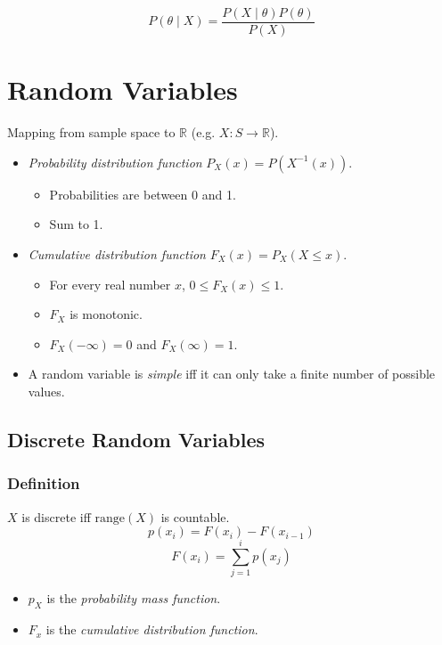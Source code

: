 \documentclass[twocolumn,english]{article}
\begin{document}
\[
P\left(\theta\mid X\right)=\frac{P\left(X\mid\theta\right)P\left(\theta\right)}{P\left(X\right)}
\]

\section{Random Variables}

Mapping from sample space to $\mathbb{R}$ (e.g. $X:S\rightarrow\mathbb{R}$).
\begin{itemize}
\item \emph{Probability distribution function} $P_{X}\left(x\right)=P\left(X^{-1}\left(x\right)\right)$.
\begin{itemize}
\item Probabilities are between 0 and 1.
\item Sum to 1.
\end{itemize}
\item \emph{Cumulative distribution function} $F_{X}\left(x\right)=P_{X}\left(X\leq x\right)$.
\begin{itemize}
\item For every real number $x$, $0\leq F_{X}\left(x\right)\leq1$.
\item $F_{X}$ is monotonic.
\item $F_{X}\left(-\infty\right)=0$ and $F_{X}\left(\infty\right)=1$.
\end{itemize}
\item A random variable is \emph{simple} iff it can only take a finite number
of possible values.
\end{itemize}

\subsection{Discrete Random Variables}

\subsubsection{Definition}

$X$ is discrete iff $\text{range}\left(X\right)$ is countable.
\[
p\left(x_{i}\right)=F\left(x_{i}\right)-F\left(x_{i-1}\right)
\]
\[
F\left(x_{i}\right)=\sum_{j=1}^{i}p\left(x_{j}\right)
\]
\begin{itemize}
\item $p_{X}$ is the \emph{probability mass function}.
\item $F_{x}$ is the \emph{cumulative distribution function}.
\end{itemize}
\end{document}
